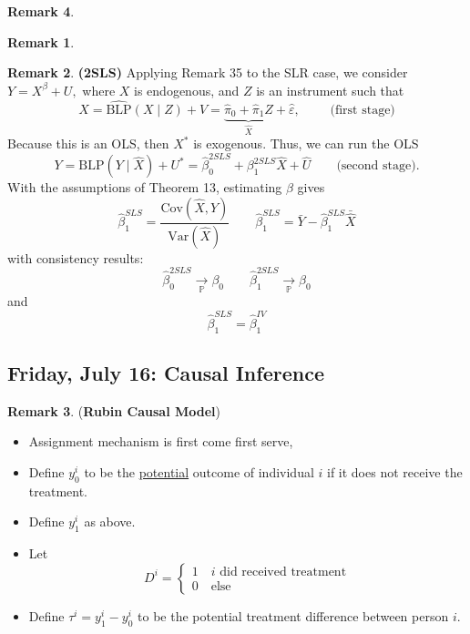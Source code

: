 \documentclass[10pt, oneside]{article}
\newcommand{\bbP}{\mathbb{P}}
\newcommand{\Var}{\text{Var}}
\newcommand{\Cov}{\text{Cov}}
\theoremstyle{definition}
\newtheorem{rem}{Remark}
\begin{document}
\begin{rem}
\begin{rem}
\end{rem}

\hline
\begin{rem}
    \textbf{(2SLS)} Applying Remark 35 to the SLR case, we consider $Y = X^\beta + U,$ where $X$ is endogenous, and $Z$ is an instrument such that 
    \[X = \hat{\text{BLP}}(X \mid Z) + V = \underbrace{\hat \pi_0 + \hat \pi_1Z}_{\hat X} + \hat \varepsilon,  \qquad \text{ (first stage)}\] Because this is an OLS, then $X^*$ is exogenous. Thus, we can run the OLS
    \[Y = \text{BLP}(Y \mid \hat X) + U^*= \hat \beta_0^{2SLS} + \beta_1^{2SLS}\hat X + \hat U \qquad \text{(second stage)}.\] With the assumptions of Theorem 13, estimating $\beta$ gives
\[\hat\beta_1^{SLS} = \frac{\Cov(\hat{X}, Y)}{\Var(\hat X)} \qquad \hat\beta_1^{SLS}= \bar Y - \hat\beta_1^{SLS}\bar {\hat X}\]
    with consistency results: 
    \[\hat\beta_0^{2SLS}\xrightarrow[\bbP]{}\beta_0 \qquad \hat\beta_1^{2SLS}\xrightarrow[\bbP]{}\beta_0\]
    and 
    \[\hat\beta_1^{SLS} = \hat \beta_1^{IV}\]
\end{rem}


\newpage
\subsection{Friday, July 16: Causal Inference}

\begin{rem}
    (\textbf{Rubin Causal Model}) 
    \begin{itemize}
        \item Assignment mechanism is first come first serve,
        \item Define $y_0^i$ to be the \underline{potential} outcome of individual $i$ if it does not receive the treatment.
        \item Define $y_1^i$ as above.
        \item Let 
        \[D^i = \begin{cases}1 \quad i \text{ did received treatment}
        \\
        0 \quad \text{else}
        \end{cases}\]
        \item Define $\tau^i = y_1^i - y_0^i$ to be the potential treatment difference between person $i.$ \begin{center}
\end{center}


\end{itemize}
\end{rem}
\end{rem}
\end{document}
